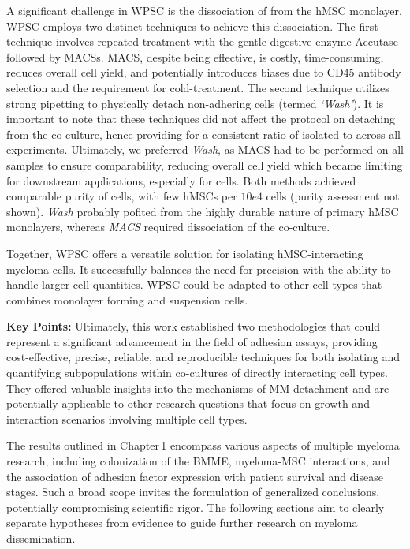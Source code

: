 A significant challenge in \ac{WPSC} is the dissociation of \MAina from the hMSC
monolayer. WPSC employs two distinct techniques to achieve this dissociation.
The first technique involves repeated treatment with the gentle digestive enzyme
Accutase followed by \acp{MACS}. \ac{MACS}, despite being effective, is costly,
time-consuming, reduces overall cell yield, and potentially introduces biases
due to CD45 antibody selection and the requirement for cold-treatment. The
second technique utilizes strong pipetting to physically detach non-adhering
cells (termed \emph{`Wash'}). It is important to note that these techniques did
not affect the protocol on detaching \nMAina from the co-culture, hence
providing for a consistent ratio of isolated \MAina to \nMAina across all
experiments. Ultimately, we preferred \emph{Wash}, as \ac{MACS} had to be performed
on all samples to ensure comparability, reducing overall cell yield which became
limiting for downstream applications, especially for \nMAina cells. Both methods
achieved comparable purity of \MAina cells, with few hMSCs per $10e4$
\MAina cells (purity assessment not shown). \emph{Wash} probably pofited from
the highly durable nature of primary hMSC monolayers, whereas \emph{MACS}
required dissociation of the co-culture.

Together, \ac{WPSC} offers a versatile solution for isolating hMSC-interacting
myeloma cells. It successfully balances the need for precision with the ability
to handle larger cell quantities. \ac{WPSC} could be adapted to other cell types
that combines monolayer forming and suspension cells.



\textbf{Key Points:} Ultimately, this work established two methodologies
that could represent a significant advancement in the field of adhesion assays,
providing cost-effective, precise, reliable, and reproducible techniques for
both isolating and quantifying subpopulations within co-cultures of directly
interacting cell types. They offered valuable insights into the mechanisms of MM
detachment and are potentially applicable to other research questions that focus
on growth and interaction scenarios involving multiple cell types.








%
\label{sec:discussion_framework}%
The results outlined in Chapter\,1 encompass various aspects of multiple myeloma
research, including colonization of the \ac{BMME}, myeloma-\ac{MSC}
interactions, and the association of adhesion factor%
\footterm{\footadhesionfactor}{\label{foot:adhesionfactor}}%
expression with patient survival and disease stages. Such a broad scope invites
the formulation of generalized conclusions, potentially compromising scientific
rigor. The following sections aim to clearly separate hypotheses from evidence
to guide further research on myeloma dissemination.

